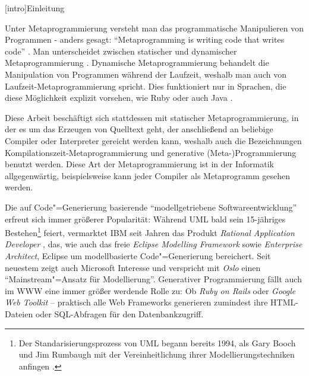 \documentclass[12pt, a4paper, bibgerm]{scrbook}
\newcommand\lchapter{}
\newcommand{\cgen}{Code"=Generierung}
\newcommand{\mprog}{Metaprogrammierung}
\begin{document}


\lchapter[intro]{Einleitung}


Unter \mprog{} versteht man das programmatische Manipulieren von
Programmen - anders gesagt: "`Metaprogramming is writing code that
writes code"' \cite[S.16]{metaprog-ruby}. Man unterscheidet zwischen
statischer und dynamischer
\mprog{} \cite[S.17]{metaprog-ruby}. Dynamische \mprog{} behandelt die
Manipulation von Programmen während der Laufzeit, weshalb man auch von
Laufzeit-\mprog{} spricht. Dies funktioniert nur in Sprachen, die diese
Möglichkeit explizit vorsehen, wie Ruby \cite{metaprog-ruby} oder auch
Java \cite{JavaReflection}.

Diese Arbeit beschäftigt sich stattdessen mit statischer \mprog{}, in
der es um das Erzeugen von Quelltext geht, der anschließend an beliebige
Compiler oder Interpreter gereicht werden kann, weshalb auch die
Bezeichnungen Kompilationszeit-\mprog{} und generative
(Meta-)Programmierung \cite[S.17]{metaprog-sh} benutzt werden. Diese Art
der \mprog{} ist in der Informatik allgegenwärtig, beispielsweise kann
jeder Compiler als Metaprogramm gesehen werden.

Die auf \cgen{} basierende "`modellgetriebene Softwareentwicklung"'
erfreut sich immer größerer Popularität: Während UML \cite{UML} bald
sein 15-jähriges Bestehen\footnote{Der Standarisierungsprozess von UML
  begann bereits 1994, als Gary Booch und Jim Rumbaugh mit der
  Vereinheitlichung ihrer Modellierungstechniken anfingen
  \cite[S. 17]{UML}.} feiert, vermarktet IBM seit Jahren das Produkt
\textit{Rational Application Developer} \cite{RAD}, das, wie auch das
freie \textit{Eclipse Modelling Framework} sowie \textit{Enterprise
  Architect}, Eclipse um modellbasierte \cgen{} bereichert. Seit
neuestem zeigt auch Microsoft Interesse und verspricht mit \textit{Oslo}
\cite{Oslo} einen "`Mainstream"=Ansatz für Modellierung"'. Generativer
Programmierung fällt auch im WWW eine immer größer werdende Rolle zu: Ob
\textit{Ruby on Rails} oder \textit{Google Web Toolkit} -- praktisch
alle Web Frameworks generieren zumindest ihre HTML-Dateien oder
SQL-Abfragen für den Datenbankzugriff.
\end{document}

